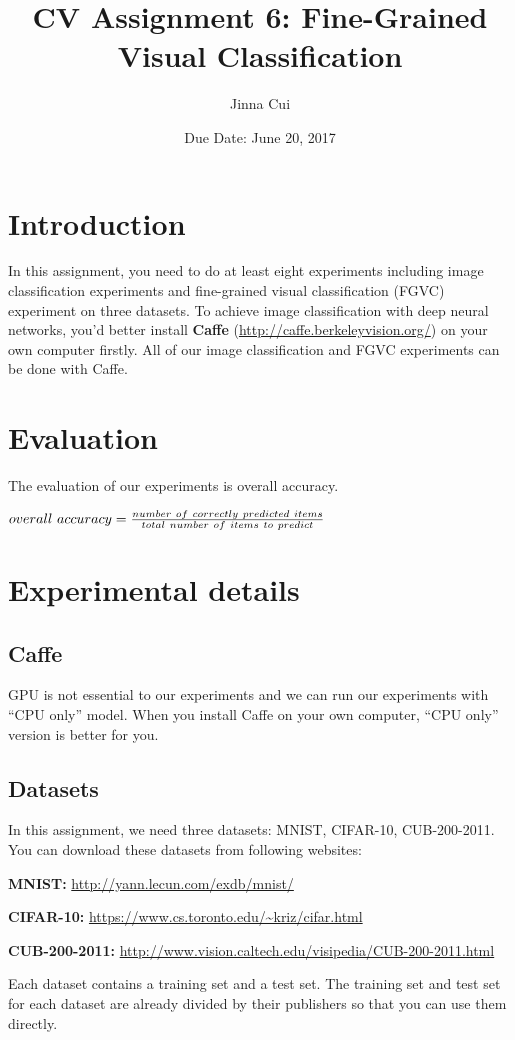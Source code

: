 \documentclass[a4paper,11pt]{article}
\title{CV Assignment 6: Fine-Grained Visual Classification}
\author{Jinna Cui}
\date{Due Date: June 20, 2017}
\begin{document}
\maketitle
\section{Introduction}
 I n   t h i s   a s s i g n m e n t ,   you need to do at least  eight experiments including image classification experiments and fine-grained visual classification (FGVC) experiment on three datasets. To achieve image classification with deep neural networks, you'd better install \textbf{Caffe} (\url{http://caffe.berkeleyvision.org/}) on your own computer firstly. All of our image classification and FGVC experiments can be done with Caffe. 
\section{Evaluation}
The evaluation of our experiments is overall accuracy.

\begin{math}
\centering
overall\ accuracy = \frac{number\ of\ correctly\ predicted\ items}{total\ number\ of\ items\ to\ predict}
\end{math}
\section{Experimental details}
\subsection{Caffe}
GPU is not essential to our experiments and we can run our experiments with ``CPU only'' model. When you install Caffe on your own computer, ``CPU only'' version is better for you. 
\subsection{Datasets}
In this assignment, we need three datasets: MNIST, CIFAR-10, CUB-200-2011. You can download these datasets from following websites: 

\textbf{MNIST:} \url{http://yann.lecun.com/exdb/mnist/}

\textbf{CIFAR-10:} \url{https://www.cs.toronto.edu/~kriz/cifar.html}

\textbf{CUB-200-2011:} \url{http://www.vision.caltech.edu/visipedia/CUB-200-2011.html}

Each dataset contains a training set and a test set. The training set and test set for each dataset are already divided by their publishers so that you can use them directly. 
\end{document}
